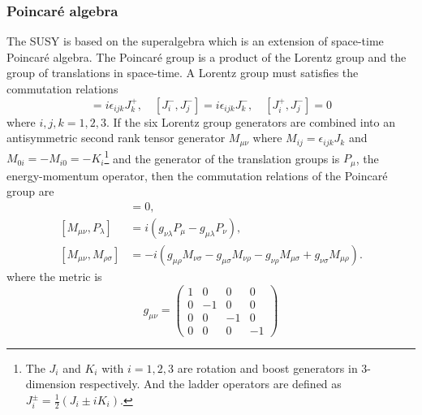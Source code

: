 \subsubsection{Poincar\'{e} algebra}
\label{subsubsec:susy_poincare}
The SUSY is based on the superalgebra which is an extension of space-time Poincar\'{e} algebra.
The Poincar\'{e} group is a product of the Lorentz group and the group of translations in space-time.
A Lorentz group must satisfies the commutation relations
%
\begin{equation}
[J^{+}_{i}, J^{+}_{j}] = i \epsilon_{ijk} J^{+}_{k}, \quad 
[J^{-}_{i}, J^{-}_{j}] = i \epsilon_{ijk} J^{-}_{k}, \quad 
[J^{+}_{i}, J^{-}_{j}] = 0
\label{eq:susy_Lorentz_commutation_relations}
\end{equation}
%
where $i, j, k = 1, 2, 3$.
If the six Lorentz group generators are combined into an antisymmetric second rank tensor generator $M_{\mu\nu}$ where $M_{ij} = \epsilon_{ijk}J_{k}$ and $M_{0i} = -M_{i0} = -K_{i}$\footnote{The $J_{i}$ and $K_{i}$ with $i=1,2,3$ are rotation and boost generators in 3-dimension respectively. And the ladder operators are defined as $J_{i}^{\pm} = \frac{1}{2} (J_{i} \pm i K_{i})$.} and the generator of the translation groups is $P_{\mu}$, the energy-momentum operator, then the commutation relations of the Poincar\'{e} group are
%
\begin{align}
[P_{\mu}, P_{\nu}] &= 0 ,\\
[M_{\mu \nu}, P_{\lambda}] &= i (g_{\nu \lambda} P_{\mu} - g_{\mu \lambda} P_{\nu}) ,\\
[M_{\mu \nu}, M_{\rho \sigma}] &= -i (g_{\mu \rho} M_{\nu \sigma} - g_{\mu \sigma} M_{\nu \rho} - g_{\nu \rho} M_{\mu \sigma} + g_{\nu \sigma} M_{\mu \rho}) .
\label{eq:susy_Poincare_commutation_relations}
\end{align}
where the metric is 
\begin{equation}
g_{\mu \nu} =
\left(
\begin{array}{cccc}
1 & 0 & 0 & 0\\
0 & -1 & 0 & 0\\
0 & 0 & -1 & 0\\
0 & 0 & 0 & -1   
\end{array}
\right)
\label{eq:susy_metric}
\end{equation}
%


